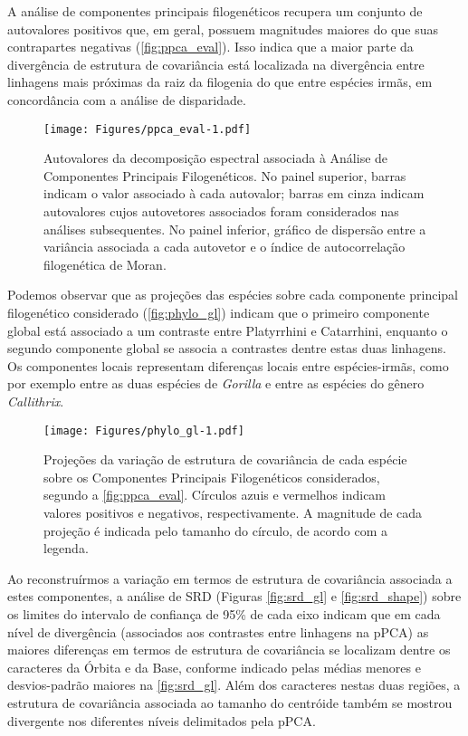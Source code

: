 \documentclass[11pt,twoside]{report}
\begin{document}
A análise de componentes principais filogenéticos recupera um conjunto
de autovalores positivos que, em geral, possuem magnitudes maiores do
que suas contrapartes negativas (\autoref{fig:ppca_eval}). Isso indica
que a maior parte da divergência de estrutura de covariância está
localizada na divergência entre linhagens mais próximas da raiz da
filogenia do que entre espécies irmãs, em concordância com a análise de
disparidade.

\begin{figure}[htbp]
\centering
\texttt{[image: Figures/ppca\_eval-1.pdf]}
\caption{Autovalores da decomposição espectral associada à Análise de
Componentes Principais Filogenéticos. No painel superior, barras indicam
o valor associado à cada autovalor; barras em cinza indicam autovalores
cujos autovetores associados foram considerados nas análises
subsequentes. No painel inferior, gráfico de dispersão entre a variância
associada a cada autovetor e o índice de autocorrelação filogenética de
Moran. \label{fig:ppca_eval}}
\end{figure}

Podemos observar que as projeções das espécies sobre cada componente
principal filogenético considerado (\autoref{fig:phylo_gl}) indicam que
o primeiro componente global está associado a um contraste entre
Platyrrhini e Catarrhini, enquanto o segundo componente global se
associa a contrastes dentre estas duas linhagens. Os componentes locais
representam diferenças locais entre espécies-irmãs, como por exemplo
entre as duas espécies de \emph{Gorilla} e entre as espécies do gênero
\emph{Callithrix}.

\begin{figure}[htbp]
\centering
\texttt{[image: Figures/phylo\_gl-1.pdf]}
\caption{Projeções da variação de estrutura de covariância de cada
espécie sobre os Componentes Principais Filogenéticos considerados,
segundo a \autoref{fig:ppca_eval}. Círculos azuis e vermelhos indicam
valores positivos e negativos, respectivamente. A magnitude de cada
projeção é indicada pelo tamanho do círculo, de acordo com a legenda.
\label{fig:phylo_gl}}
\end{figure}

Ao reconstruírmos a variação em termos de estrutura de covariância
associada a estes componentes, a análise de SRD (Figuras
\ref{fig:srd_gl} e \ref{fig:srd_shape}) sobre os limites do intervalo de
confiança de 95\% de cada eixo indicam que em cada nível de divergência
(associados aos contrastes entre linhagens na pPCA) as maiores
diferenças em termos de estrutura de covariância se localizam dentre os
caracteres da Órbita e da Base, conforme indicado pelas médias menores e
desvios-padrão maiores na \autoref{fig:srd_gl}. Além dos caracteres
nestas duas regiões, a estrutura de covariância associada ao tamanho do
centróide também se mostrou divergente nos diferentes níveis delimitados
pela pPCA.
\end{document}

